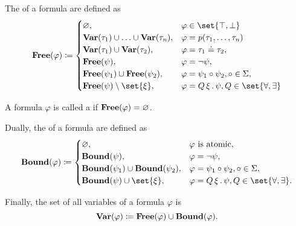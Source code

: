 \begin{definition}
\begin{thmenum}
     The  of a formula are defined as
    \begin{equation}\label{eq:def:first_order_syntax/formula_free_variables}
      \boldop{Free}(\varphi) \coloneqq \begin{cases}
        \varnothing,                                            &\varphi \in \set{ \top, \bot } \\
        \boldop{Var}(\tau_1) \cup \ldots \cup \boldop{Var}(\tau_n), &\varphi = p(\tau_1, \ldots, \tau_n) \\
        \boldop{Var}(\tau_1) \cup \boldop{Var}(\tau_2),             &\varphi = \tau_1 \doteq \tau_2, \\
        \boldop{Free}(\psi),                                      &\varphi = \neg \psi, \\
        \boldop{Free}(\psi_1) \cup \boldop{Free}(\psi_2),           &\varphi = \psi_1 \circ \psi_2, \circ \in \Sigma, \\
        \boldop{Free}(\psi) \setminus \set{ \xi },                &\varphi = \quantifier{Q}{\xi} \psi, Q \in \set{ \forall, \exists }
      \end{cases}
    \end{equation}

     A formula \( \varphi \) is called a  if \( \operatorname{\mathbf{Free}}(\varphi) = \varnothing \).

     Dually, the  of a formula are defined as
    \begin{equation}\label{eq:def:first_order_syntax/formula_bound_variables}
      \boldop{Bound}(\varphi) \coloneqq \begin{cases}
        \varnothing,                                    &\varphi \text{ is atomic}, \\
        \boldop{Bound}(\psi),                             &\varphi = \neg \psi, \\
        \boldop{Bound}(\psi_1) \cup \boldop{Bound}(\psi_2), &\varphi = \psi_1 \circ \psi_2, \circ \in \Sigma, \\
        \boldop{Bound}(\psi) \cup \set{ \xi },            &\varphi = \quantifier{Q}{\xi} \psi, Q \in \set{ \forall, \exists }.
      \end{cases}
    \end{equation}

     Finally, the set of all variables of a formula \( \varphi \) is
    \begin{equation}\label{eq:def:first_order_syntax/formula_variables}
      \operatorname{\mathbf{Var}}(\varphi) \coloneqq \operatorname{\mathbf{Free}}(\varphi) \cup \operatorname{\mathbf{Bound}}(\varphi).
    \end{equation}
  \end{thmenum}
\end{definition}

